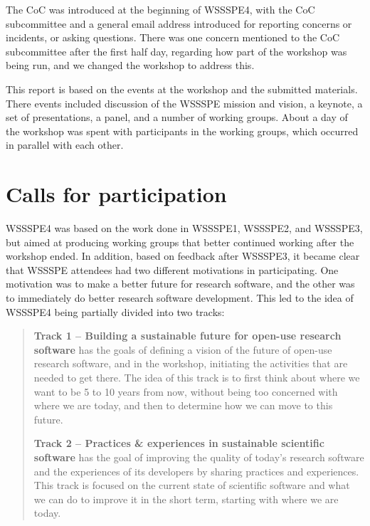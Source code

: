 \documentclass[11pt, oneside]{amsart}
\begin{document}
The CoC was introduced at the beginning of WSSSPE4, with the CoC subcommittee
and a general email address introduced for reporting concerns or incidents, or
asking questions.  There was one concern mentioned to the CoC subcommittee
after the first half day,
regarding how part of the workshop was being run, and we changed the workshop
to address this.

This report is based on the events at the workshop and the submitted materials.
There events included discussion of the WSSSPE mission and vision, a keynote,
a set of presentations, a panel, and a number of working groups.  About a day of the
workshop was spent with participants in the working groups, which occurred in parallel
with each other.

\section{Calls for participation} \label{sec:preworkshop}

WSSSPE4 was based on the work done in WSSSPE1, WSSSPE2, and WSSSPE3, but aimed
at producing working groups that better continued working after the workshop ended.
In addition, based on feedback after WSSSPE3, it became clear that WSSSPE attendees
had two different motivations in participating.  One motivation was to make a better future
for research software, and the other was to immediately do better research software development.
This led to the idea of WSSSPE4 being partially divided into two tracks:

\begin{quote}
    \textbf{Track 1 -- Building a sustainable future for open-use research
    software} has the goals of defining a vision of the future of open-use
    research software, and in the workshop, initiating the activities that are
    needed to get there. The idea of this track is to first think about where
    we want to be 5 to 10 years from now, without being too concerned with
    where we are today, and then to determine how we can move to this future.

    \noindent \textbf{Track 2 -- Practices \& experiences in sustainable scientific software}
    has the goal of improving the quality of today's research software and the
    experiences of its developers by sharing practices and experiences.
    This track is focused on the current state of scientific software and what
    we can do to improve it in the short term, starting with where we are today.
\end{quote}
\end{document}
